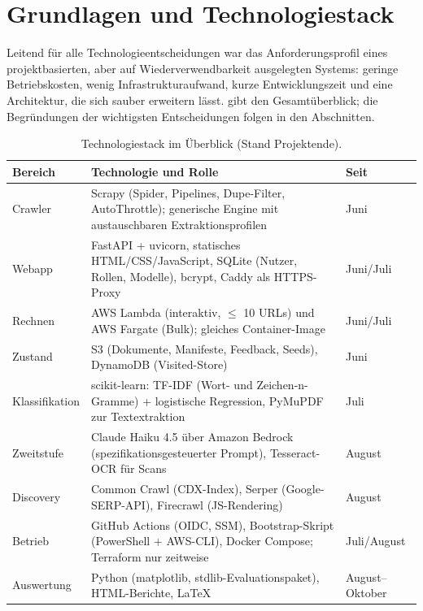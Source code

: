 \chapter{Grundlagen und Technologiestack}\label{ch:grundlagen}

Leitend für alle Technologieentscheidungen war das Anforderungsprofil eines projektbasierten, aber auf Wiederverwendbarkeit ausgelegten Systems: geringe Betriebskosten, wenig Infrastrukturaufwand, kurze Entwicklungszeit und eine Architektur, die sich sauber erweitern lässt.  gibt den Gesamtüberblick; die Begründungen der wichtigsten Entscheidungen folgen in den Abschnitten.

\begin{table}[htbp]
\centering\small
\caption{Technologiestack im Überblick (Stand Projektende).}\label{tab:stack}
\begin{tabularx}{\linewidth}{@{}l X l@{}}
\toprule
\textbf{Bereich} & \textbf{Technologie und Rolle} & \textbf{Seit} \\
\midrule
Crawler & Scrapy (Spider, Pipelines, Dupe-Filter, AutoThrottle); generische Engine mit austauschbaren Extraktionsprofilen & Juni \\
Webapp & FastAPI + uvicorn, statisches HTML/CSS/JavaScript, SQLite (Nutzer, Rollen, Modelle), bcrypt, Caddy als HTTPS-Proxy & Juni/Juli \\
Rechnen & AWS Lambda (interaktiv, $\le$ 10 URLs) und AWS Fargate (Bulk); gleiches Container-Image & Juni/Juli \\
Zustand & S3 (Dokumente, Manifeste, Feedback, Seeds), DynamoDB (Visited-Store) & Juni \\
Klassifikation & scikit-learn: TF-IDF (Wort- und Zeichen-n-Gramme) + logistische Regression, PyMuPDF zur Textextraktion & Juli \\
Zweitstufe & Claude Haiku 4.5 über Amazon Bedrock (spezifikationsgesteuerter Prompt), Tesseract-OCR für Scans & August \\
Discovery & Common Crawl (CDX-Index), Serper (Google-SERP-API), Firecrawl (JS-Rendering) & August \\
Betrieb & GitHub Actions (OIDC, SSM), Bootstrap-Skript (PowerShell + AWS-CLI), Docker Compose; Terraform nur zeitweise & Juli/August \\
Auswertung & Python (matplotlib, stdlib-Evaluationspaket), HTML-Berichte, \LaTeX{} & August--Oktober \\
\bottomrule
\end{tabularx}
\end{table}

